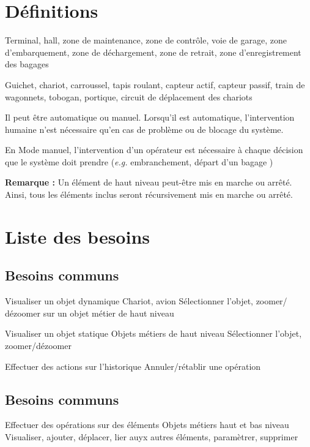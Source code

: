 \section{Définitions}
{Terminal, hall,  zone de maintenance, zone de contrôle, voie de garage, zone d'embarquement, zone de déchargement, zone de retrait, zone d'enregistrement des bagages}


{Guichet, chariot, carroussel, tapis roulant, capteur actif, capteur passif,  train de wagonnets, tobogan, portique, circuit de déplacement des chariots}


{
Il peut être automatique ou manuel. Lorsqu'il est automatique, l'intervention humaine n'est nécessaire qu'en cas de problème ou de blocage du système.

En Mode manuel, l'intervention d'un opérateur est nécessaire à chaque décision que le système doit prendre (\textsl{e.g.} embranchement, départ d'un bagage )
}

\textbf{Remarque :} Un élément de haut niveau peut-être mis en marche ou arrêté. Ainsi, tous les éléments inclus seront récursivement mis en marche ou arrêté.

\section{Liste des besoins}
\subsection{Besoins communs}
\nBesoin
{Visualiser un objet dynamique}
{Chariot, avion}
{Sélectionner l'objet, zoomer/ dézoomer sur un objet métier de haut niveau}

\nBesoin
{Visualiser un objet statique}
{Objets métiers de haut niveau}
{Sélectionner l'objet, zoomer/dézoomer}

\nBesoin
{Effectuer des actions sur l'historique}
{}
{Annuler/rétablir une opération}

\subsection{Besoins communs}
\setcounter{cntBesoins}{1}

\nBesoin
{Effectuer des opérations sur des éléments}
{Objets métiers haut et bas niveau}
{Visualiser, ajouter, déplacer, lier auyx autres éléments, paramètrer, supprimer}


